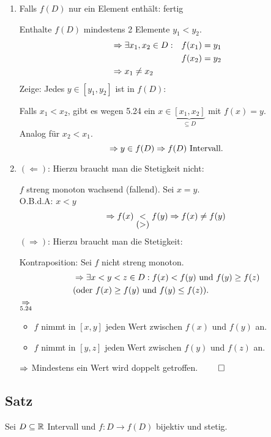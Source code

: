 \documentclass[10pt, a4paper, fleqn]{article}
\begin{document}
\begin{enumerate}
    \item Falls $f(D)$ nur ein Element enthält: fertig \checkmark

    Enthalte $f(D)$ mindestens 2 Elemente $y_1 < y_2.$
    \[\begin{aligned}
        &\Rightarrow \exists x_1, x_2 \in D: & f(x_1) = y_1 \\
        &&f(x_2) = y_2 \\
        &\Rightarrow x_1 \neq x_2
    \end{aligned}\]
    Zeige: Jedes $y \in [y_1, y_2]$ ist in $f(D)$:

    Falls $x_1 < x_2$, gibt es wegen 5.24 ein $x \in \underbrace{[x_1, x_2]}_{\subseteq D}$ 
    mit $f(x) = y$. \\
    Analog für $x_2 < x_1$.
    \[
        \Rightarrow y \in f(D) \Rightarrow f(D) \text{ Intervall.}    
    \]

    \item $(\Leftarrow)$: Hierzu braucht man die Stetigkeit nicht:

    $f$ streng monoton wachsend (fallend). Sei $x = y$. \\
    O.B.d.A: $x < y$
    \[
        \Rightarrow f(x) \underset{\hbox{(>)}}{<} f(y) \Rightarrow f(x) \neq f(y)    
    \]
    $(\Rightarrow)$: Hierzu braucht man die Stetigkeit: 
    
    Kontraposition: Sei $f$ nicht
    streng monoton.
    \[\begin{aligned}
        &\Rightarrow \exists x < y < z \in D: f(x) < f(y) \text{ und } f(y) \geq f(z) \\ 
        &(\text{oder } f(x) \geq f(y) \text{ und } f(y) \leq f(z)).
    \end{aligned}\]
    $\underset{5.24}{\Rightarrow}$ \begin{itemize}
        \item $f$ nimmt in $[x, y]$ jeden Wert zwischen $f(x)$ und $f(y)$ an.
        \item $f$ nimmt in $[y, z]$ jeden Wert zwischen $f(y)$ und $f(z)$ an.
    \end{itemize}
    $\Rightarrow$ Mindestens ein Wert wird doppelt getroffen. $\qed$
\end{enumerate}

\subsection{Satz}
Sei $D \subseteq \mathbb{R}$ Intervall und $f: D \to f(D)$ bijektiv und stetig.
\end{document}

